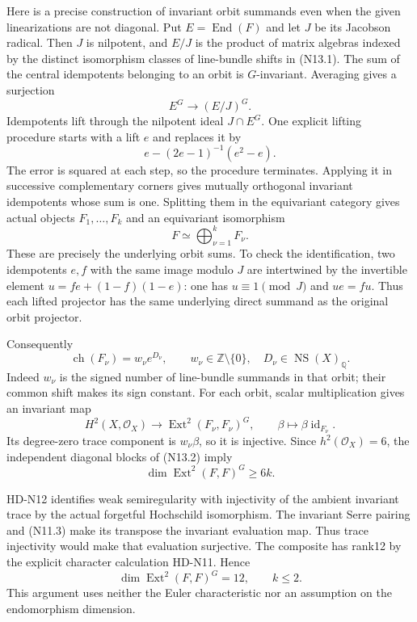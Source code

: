 Here is a precise construction of invariant orbit summands even
when the given linearizations are not diagonal. Put
$E=\operatorname{End}(F)$ and let $J$ be its Jacobson radical.
Then $J$ is nilpotent, and
$E/J$ is the product of matrix algebras indexed by the distinct
isomorphism classes of line-bundle shifts in (N13.1).
The sum of the central idempotents belonging to an orbit is
$G$-invariant. Averaging gives a surjection
\[
 E^G\longrightarrow(E/J)^G.
\]
Idempotents lift through the nilpotent ideal $J\cap E^G$.
One explicit lifting procedure starts with a lift $e$ and
replaces it by
\[
 e-(2e-1)^{-1}(e^2-e).
\]
The error is squared at each step, so the procedure terminates.
Applying it in successive complementary corners gives mutually
orthogonal invariant idempotents whose sum is one. Splitting
them in the equivariant category gives actual objects $F_1,\ldots,F_k$
and an equivariant isomorphism
\[
 F\simeq\bigoplus_{\nu=1}^kF_\nu.                         \tag{N13.2}
\]
These are precisely the underlying orbit sums. To check the
identification, two idempotents $e,f$ with the same image modulo
$J$ are intertwined by the invertible element
$u=fe+(1-f)(1-e)$: one has $u\equiv1\pmod J$ and $ue=fu$.
Thus each lifted projector has the same underlying direct
summand as the original orbit projector.

Consequently
\[
 \operatorname{ch}(F_\nu)=w_\nu e^{D_\nu},
 \qquad w_\nu\in\mathbb Z\setminus\{0\},\quad
 D_\nu\in\operatorname{NS}(X)_{\mathbb Q}.                \tag{N13.3}
\]
Indeed $w_\nu$ is the signed number of line-bundle summands in
that orbit; their common shift makes its sign constant.
For each orbit, scalar multiplication gives an invariant map
\[
 H^2(X,\mathcal O_X)\longrightarrow
 \operatorname{Ext}^2(F_\nu,F_\nu)^G,
 \qquad\beta\longmapsto\beta\operatorname{id}_{F_\nu}.
                                                               \tag{N13.4}
\]
Its degree-zero trace component is $w_\nu\beta$, so it is
injective. Since $h^2(\mathcal O_X)=6$, the independent diagonal
blocks of (N13.2) imply
\[
 \dim\operatorname{Ext}^2(F,F)^G\ge6k.                    \tag{N13.5}
\]

HD-N12 identifies weak semiregularity with injectivity of the
ambient invariant trace by the actual forgetful Hochschild
isomorphism. The invariant Serre pairing and (N11.3) make its
transpose the invariant evaluation map. Thus trace injectivity
would make that evaluation surjective. The composite has
rank12 by the explicit character calculation HD-N11. Hence
\[
 \dim\operatorname{Ext}^2(F,F)^G=12,
 \qquad k\le2.                                          \tag{N13.6}
\]
This argument uses neither the Euler characteristic nor an
assumption on the endomorphism dimension.

